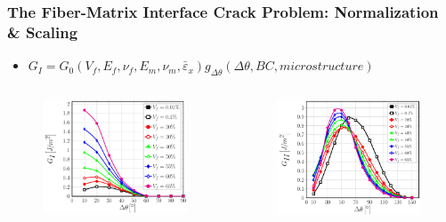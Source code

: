 \documentclass[first,firstsupp,lastsupp,last,hyperref,table]{ETHclass}
\begin{document}
\begin{frame}
\frametitle{\vspace{0.3cm}\small The Fiber-Matrix Interface Crack Problem: Normalization \& Scaling}
\vspace{-1.cm}
\centering
\begin{itemize}[label=]
\centering
\item $G_{I}=G_{0}\left(V_{f},E_{f},\nu_{f},E_{m},\nu_{m},\bar{\varepsilon}_{x}\right)g_{\Delta\theta}\left(\Delta\theta,BC,microstructure\right)$
\end{itemize}
\begin{columns}[c]
\begin{column}{0.5\textwidth}
\begin{figure}
\includegraphics[width=\columnwidth]{GI-free-dim.pdf}
\end{figure}
\end{column}
\begin{column}{0.5\textwidth}
\begin{figure}
\includegraphics[width=\columnwidth]{GII-free-dim.pdf}
\end{figure}
\end{column}
\end{columns}
\end{frame}
\end{document}
